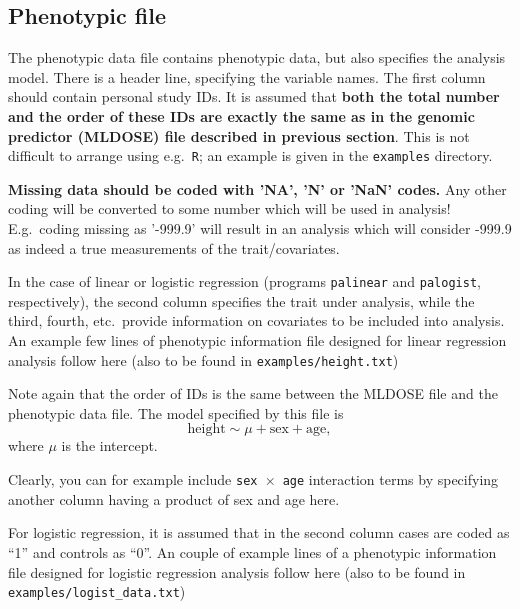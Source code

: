 \documentclass[12pt,a4paper]{article}
\begin{document}
\subsection{Phenotypic file}
\label{ssec:phenoin}

The phenotypic data file contains phenotypic data, but also specifies the
analysis model. There is a header line, specifying the variable names.
The first column should contain personal study IDs. It is assumed
that \textbf{both the total number and the order of these IDs are
exactly the same as in the genomic predictor (MLDOSE) file described in
previous section}. This is not difficult to arrange using e.g.~\texttt{R};
an example is given in the \texttt{examples} directory.

\textbf{Missing data should be coded with 'NA', 'N' or 'NaN' codes.} Any
other coding will be converted to some number which will be used in
analysis! E.g.~coding missing as '-999.9' will result in an analysis which
will consider -999.9 as indeed a true measurements of the trait/covariates.

In the case of linear or logistic regression (programs \texttt{palinear} and
\texttt{palogist}, respectively), the second column specifies the trait
under analysis, while the third, fourth, etc.~provide information on
covariates to be included into analysis.
An example few lines of phenotypic information file designed for
linear regression analysis follow here (also
to be found in \texttt{examples/height.txt})



Note again that the order of IDs is the same between the MLDOSE file
and the phenotypic data file. The model specified by this file is
\begin{equation*}
\textrm{height} \sim \mu + \textrm{sex} + \textrm{age},
\end{equation*}
where $\mu$ is the intercept.

Clearly, you can for example include \texttt{sex $\times$ age} interaction terms by
specifying another column having a product of sex and age here.

For logistic regression, it is assumed that in the second column cases are
coded as ``1'' and controls as ``0''. An couple of example lines of a phenotypic
information file designed for logistic regression analysis follow here (also
to be found in \texttt{examples/logist\_data.txt})


\end{document}
